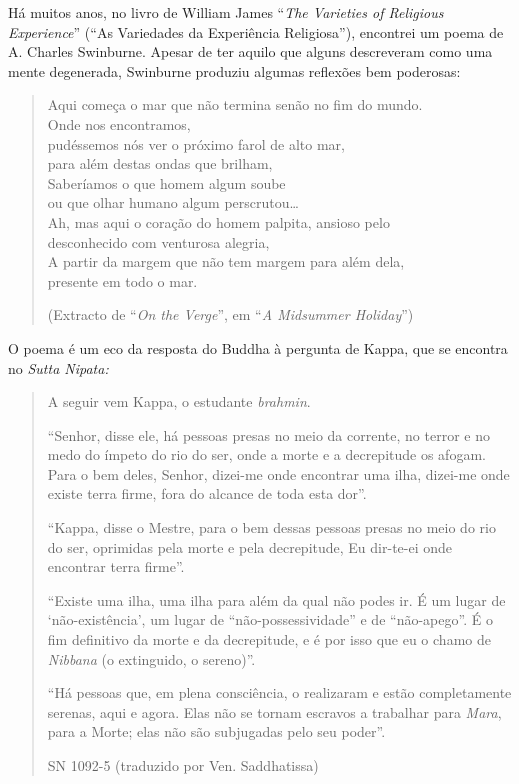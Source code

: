 Há muitos anos, no livro de William James ``\emph{The Varieties of
Religious Experience}'' (``As Variedades da Experiência
Religiosa''), encontrei um poema de A. Charles Swinburne. Apesar de ter
aquilo que alguns descreveram como uma mente degenerada, Swinburne
produziu algumas reflexões bem poderosas:

\begin{quote}
Aqui começa o mar que não termina senão no fim do mundo.\\
Onde nos encontramos,\\
pudéssemos nós ver o próximo farol de alto mar,\\
para além destas ondas que brilham,\\
Saberíamos o que homem algum soube\\
ou que olhar humano algum perscrutou\ldots{}\\
Ah, mas aqui o coração do homem palpita, ansioso pelo\\
desconhecido com venturosa alegria,\\
A partir da margem que não tem margem para além dela,\\
presente em todo o mar.

(Extracto de ``\emph{On the Verge}'', em ``\emph{A Midsummer Holiday}'')
\end{quote}

O poema é um eco da resposta do Buddha à pergunta de Kappa, que se
encontra no \emph{Sutta Nipata:}

\begin{quote}
A seguir vem Kappa, o estudante \emph{brahmin}.

``Senhor, disse ele, há pessoas presas no meio da corrente, no terror e
no medo do ímpeto do rio do ser, onde a morte e a decrepitude os afogam.
Para o bem deles, Senhor, dizei-me onde encontrar uma ilha, dizei-me
onde existe terra firme, fora do alcance de toda esta dor''.

``Kappa, disse o Mestre, para o bem dessas pessoas presas no meio do rio
do ser, oprimidas pela morte e pela decrepitude, Eu dir-te-ei onde
encontrar terra firme''.

``Existe uma ilha, uma ilha para além da qual não podes ir. É um lugar
de `não-existência', um lugar de ``não-possessividade'' e de
``não-apego''. É o fim definitivo da morte e da decrepitude, e é por
isso que eu o chamo de \emph{Nibbana} (o extinguido, o sereno)''.

``Há pessoas que, em plena consciência, o realizaram e estão
completamente serenas, aqui e agora. Elas não se tornam escravos a
trabalhar para \emph{Mara}, para a Morte; elas não são subjugadas pelo
seu poder''.

SN 1092-5 (traduzido por Ven. Saddhatissa)
\end{quote}

